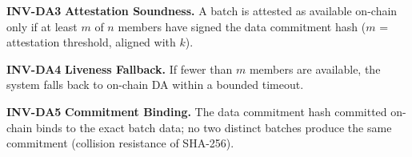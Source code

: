 \smallskip\noindent\textbf{INV-DA3} \textbf{Attestation Soundness.} A batch is attested as
available on-chain only if at least $m$ of $n$ members have signed the data
commitment hash ($m$ = attestation threshold, aligned with $k$).

\smallskip\noindent\textbf{INV-DA4} \textbf{Liveness Fallback.} If fewer than $m$ members
are available, the system falls back to on-chain DA within a bounded timeout.

\smallskip\noindent\textbf{INV-DA5} \textbf{Commitment Binding.} The data commitment hash
committed on-chain binds to the exact batch data; no two distinct batches
produce the same commitment (collision resistance of SHA-256).
